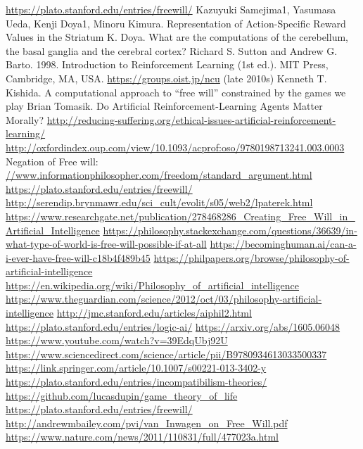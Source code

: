 \documentclass[a4paper]{article}
\begin{document}
\begin{thebibliography}{20}
 \url{https://plato.stanford.edu/entries/freewill/}
 Kazuyuki Samejima1, Yasumasa Ueda, Kenji Doya1, Minoru Kimura. Representation of Action-Specific Reward Values in the Striatum
 K. Doya. What are the computations of the cerebellum, the basal ganglia and the cerebral cortex?
 Richard S. Sutton and Andrew G. Barto. 1998. Introduction to Reinforcement Learning (1st ed.). MIT Press, Cambridge, MA, USA.
 \url{https://groups.oist.jp/ncu} (late 2010s)
 Kenneth T. Kishida. A computational approach to “free will” constrained by the games we play
 Brian Tomasik. Do Artificial Reinforcement-Learning Agents Matter Morally?
 \url{http://reducing-suffering.org/ethical-issues-artificial-reinforcement-learning/}
 \url{http://oxfordindex.oup.com/view/10.1093/acprof:oso/9780198713241.003.0003}
 Negation of Free will: \url{//www.informationphilosopher.com/freedom/standard_argument.html}
 \url{https://plato.stanford.edu/entries/freewill/}
 \url{http://serendip.brynmawr.edu/sci_cult/evolit/s05/web2/lpaterek.html}
 \url{https://www.researchgate.net/publication/278468286_Creating_Free_Will_in_Artificial_Intelligence}
 \url{https://philosophy.stackexchange.com/questions/36639/in-what-type-of-world-is-free-will-possible-if-at-all}
 \url{https://becominghuman.ai/can-a-i-ever-have-free-will-c18b4f489b45}
 \url{https://philpapers.org/browse/philosophy-of-artificial-intelligence}
 \url{https://en.wikipedia.org/wiki/Philosophy_of_artificial_intelligence}
 \url{https://www.theguardian.com/science/2012/oct/03/philosophy-artificial-intelligence}
 \url{http://jmc.stanford.edu/articles/aiphil2.html}
 \url{https://plato.stanford.edu/entries/logic-ai/}
 \url{https://arxiv.org/abs/1605.06048}
 \url{https://www.youtube.com/watch?v=39EdqUbj92U}
 \url{https://www.sciencedirect.com/science/article/pii/B9780934613033500337}
 \url{https://link.springer.com/article/10.1007/s00221-013-3402-y}
 \url{https://plato.stanford.edu/entries/incompatibilism-theories/}
 \url{https://github.com/lucasdupin/game_theory_of_life}
 \url{https://plato.stanford.edu/entries/freewill/}
 \url{http://andrewmbailey.com/pvi/van_Inwagen_on_Free_Will.pdf}
 \url{https://www.nature.com/news/2011/110831/full/477023a.html}

\end{thebibliography}
\end{document}
